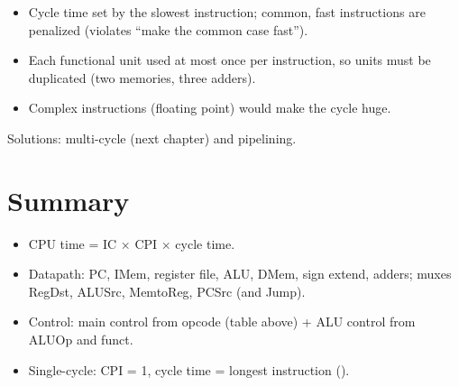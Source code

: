 \begin{important}
\begin{itemize}
  \item Cycle time set by the slowest instruction; common, fast instructions
    are penalized (violates ``make the common case fast'').
  \item Each functional unit used at most once per instruction, so units
    must be duplicated (two memories, three adders).
  \item Complex instructions (floating point) would make the cycle huge.
\end{itemize}
Solutions: multi-cycle (next chapter) and pipelining.
\end{important}

\section*{Summary}
\begin{itemize}
  \item CPU time = IC $\times$ CPI $\times$ cycle time.
  \item Datapath: PC, IMem, register file, ALU, DMem, sign extend, adders;
    muxes RegDst, ALUSrc, MemtoReg, PCSrc (and Jump).
  \item Control: main control from opcode (table above) + ALU control from
    ALUOp and funct.
  \item Single-cycle: CPI = 1, cycle time = longest instruction ().
\end{itemize}
